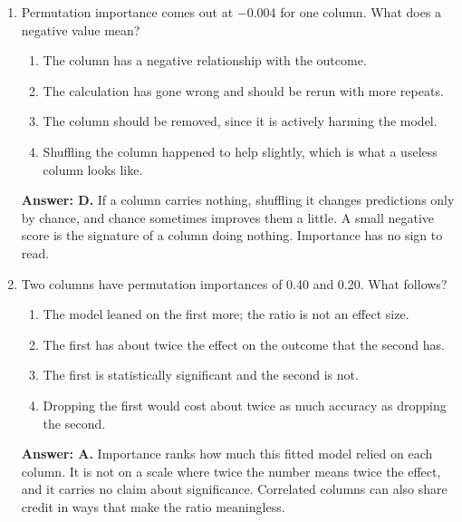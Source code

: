 \documentclass[11pt]{article}
\begin{document}
\begin{enumerate}[itemsep=14pt]
\vspace{2pt}
\textbf{Answer: A.} It is a drop in predictive performance, measured by breaking the column's relationship with the outcome and nothing else. It has no units anyone can name, no direction, and it is not comparable to a regression coefficient.
\vspace{4pt}

\item Permutation importance comes out at $-0.004$ for one column. What does a negative value mean?

\begin{enumerate}[label=\Alph*., itemsep=1pt, topsep=3pt]
  \item The column has a negative relationship with the outcome.
  \item The calculation has gone wrong and should be rerun with more repeats.
  \item The column should be removed, since it is actively harming the model.
  \item Shuffling the column happened to help slightly, which is what a useless column looks like.
\end{enumerate}

\vspace{2pt}
\textbf{Answer: D.} If a column carries nothing, shuffling it changes predictions only by chance, and chance sometimes improves them a little. A small negative score is the signature of a column doing nothing. Importance has no sign to read.
\vspace{4pt}

\item Two columns have permutation importances of 0.40 and 0.20. What follows?

\begin{enumerate}[label=\Alph*., itemsep=1pt, topsep=3pt]
  \item The model leaned on the first more; the ratio is not an effect size.
  \item The first has about twice the effect on the outcome that the second has.
  \item The first is statistically significant and the second is not.
  \item Dropping the first would cost about twice as much accuracy as dropping the second.
\end{enumerate}

\vspace{2pt}
\textbf{Answer: A.} Importance ranks how much this fitted model relied on each column. It is not on a scale where twice the number means twice the effect, and it carries no claim about significance. Correlated columns can also share credit in ways that make the ratio meaningless.
\vspace{4pt}


\end{enumerate}
\end{document}
